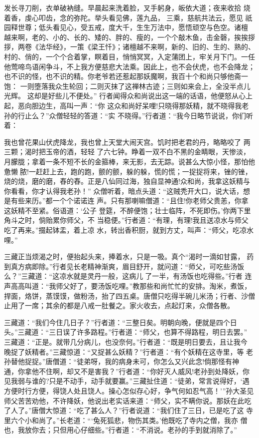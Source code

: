 发长寻刀削，衣单破衲缝。早晨起来洗着脸，叉手躬身，皈依大道；夜来收拾
烧着香，虔心叩齿，念的弥陀。举头看见佛，莲九品，三乘，慈航共法云，愿见
祇园释世尊；低头看见心，受五戒，度大千，生生万法中，愿悟顽空与色空。诸檀
越来啊，老的、小的、长的、矮的、胖的、瘦的，一个个敲木鱼，击金磬，挨挨拶
拶，两卷《法华经》，一策《梁王忏》；诸檀越不来啊，新的、旧的、生的、熟的、
村的、俏的，一个个合着掌，瞑着目，悄悄冥冥，入定蒲团上，牢关月下门。一任
他莺啼鸟语闲争斗，不上我方便慈悲大法乘。因此上，也不会伏虎，也不会降龙；
也不识的怪，也不识的精。你老爷若还惹起那妖魔啊，我百十个和尚只够他斋一饱：
一则堕落我众生轮回；二则灭抹了这禅林古迹；三则如来会上，全没半点儿光辉。
这却是好些儿不便处。”
行者闻得众和尚说出这一端的话语，他便怒从心上起，恶向胆边生，高叫一声：“你
这众和尚好呆哩!只晓得那妖精，就不晓得我老孙的行止么？”众僧轻轻的答道：“实
不晓得。”行者道：“我今日略节说说，你们听着：

我也曾花果山伏虎降龙，我也曾上天堂大闹天宫。饥时把老君的丹，略略咬了
两三颗；渴时把玉帝的酒，轻轻了六七钟。睁着一双不白不黑的金睛眼，天惨淡，
月朦胧；拿着一条不短不长的金箍棒，来无影，去无踪。说甚么大惊小怪，那怕他
惫懒脓!一赶赶上去，跑的跑，颤的颤，躲的躲，慌的慌；一捉捉将来，锉的锉，
烧的烧，磨的磨，舂的舂。正是八仙同过海，独自显神通!众和尚，我拿这妖精与
你看看，你才认得我老孙！”
众僧听着，暗点头道：“这贼秃开大口，说大话，想是有些来历。”都一个个诺诺连
声。只有那喇嘛僧道：“且住!你老师父贵恙，你拿这妖精不至紧。俗语道：‘公子
登筵，不醉便饱；壮士临阵，不死即伤。’你两下里角斗之时，倘贻累你师父，不
当稳便。”行者道：“有理，有理!我且送凉水与师父吃了再来。”掇起钵盂，着上凉
水，转出香积厨，就到方丈，叫声：“师父，吃凉水哩。”

三藏正当烦渴之时，便抬起头来，捧着水，只是一吸。真个“渴时一滴如甘露，
药到真方病即除。”行者见长老精神渐爽，眉目舒开，就问道：“师父，可吃些汤饭
么？”三藏道：“这凉水就是灵丹一般，这病儿了一半，有汤饭也吃得些。”行者
连声高高叫道：“我师父好了，要汤饭吃哩。”教那些和尚忙忙的安排。淘米，煮饭，
捍面，烙饼，蒸馍馍，做粉汤，抬了四五桌。唐僧只吃得半碗儿米汤；行者、沙僧
止用了一席；其余的都是八戒一肚餐之。家火收去，点起灯来，众僧各散。

三藏道：“我们今住几日子？”行者道：“三整日矣。明朝向晚，便就是四个日
头。”三藏道：“三日误了许多路程。”行者道：“师父，也算不得路程，明日去罢。”
三藏道：“正是。就带几分病儿，也没奈何。”行者道：“既是明日要去，且让我今
晚捉了妖精者。”三藏惊道：“又捉甚么妖精？”行者道：“有个妖精在这寺里，等
老孙替他捉捉。”唐僧道：“徒弟呀，我的病身未可，你怎么又兴此念!倘那怪有神
通，你拿他不住啊，却又不是害我？”行者道：“你好灭人威风!老孙到处降妖，你
见我弱与谁的?只是不动手，动手就要赢。”三藏扯住道：“徒弟，常言说得好，‘遇
方便时行方便，得饶人处且饶人。操心怎似存心好，争气何如忍气高！’”孙大圣见
师父苦苦劝他，不许降妖，他说出老实话来道：“师父，实不瞒你说。那妖在此吃
了人了。”唐僧大惊道：“吃了甚么人？”行者说道：“我们住了三日，已是吃了这
寺里六个小和尚了。”长老道：“‘兔死狐悲，物伤其类。’他既吃了寺内之僧，我亦
僧也，我放你去；只但用心仔细些。”行者道：“不消说。老孙的手到就消除了。”


